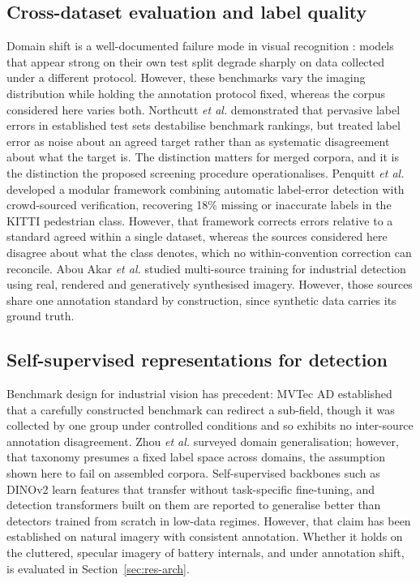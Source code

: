 \documentclass[conference]{IEEEtran}
\begin{document}
\subsection{Cross-dataset evaluation and label quality}
Domain shift is a well-documented failure mode in visual recognition
\cite{recht2019,koh2021wilds}: models that appear strong on their own test split
degrade sharply on data collected under a different protocol. However, these
benchmarks vary the imaging distribution while holding the annotation protocol
fixed, whereas the corpus considered here varies both. Northcutt \emph{et al.}
\cite{northcutt2021} demonstrated that pervasive label errors in established test
sets destabilise benchmark rankings, but treated label error as noise about an
agreed target rather than as systematic disagreement about what the target is.
The distinction matters for merged corpora, and it is the distinction the
proposed screening procedure operationalises. Penquitt \emph{et al.}
\cite{penquitt2026} developed a modular framework combining automatic label-error
detection with crowd-sourced verification, recovering 18\% missing or inaccurate
labels in the KITTI pedestrian class. However, that framework corrects errors
relative to a standard agreed within a single dataset, whereas the sources
considered here disagree about what the class denotes, which no within-convention
correction can reconcile. Abou Akar \emph{et al.} \cite{abouakar2026} studied
multi-source training for industrial detection using real, rendered and
generatively synthesised imagery. However, those sources share one annotation
standard by construction, since synthetic data carries its ground truth.

\subsection{Self-supervised representations for detection}
Benchmark design for industrial vision has precedent: MVTec AD
\cite{bergmann2019mvtec} established that a carefully constructed benchmark can
redirect a sub-field, though it was collected by one group under controlled
conditions and so exhibits no inter-source annotation disagreement. Zhou
\emph{et al.} \cite{zhou2022dg} surveyed domain generalisation; however, that
taxonomy presumes a fixed label space across domains, the assumption shown here to
fail on assembled corpora. Self-supervised backbones such as DINOv2 \cite{dinov2}
learn features that transfer without task-specific fine-tuning, and detection
transformers \cite{carion2020detr} built on them \cite{rfdetr} are reported to generalise better than detectors trained from
scratch in low-data regimes. However, that claim has been established on natural
imagery with consistent annotation. Whether it holds on the cluttered, specular
imagery of battery internals, and under annotation shift, is evaluated in
Section~\ref{sec:res-arch}.
\end{document}
